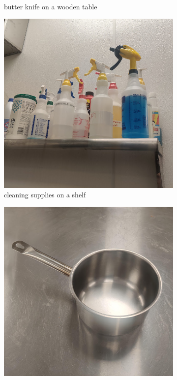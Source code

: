 \documentclass[]{article}
\begin{document}
\begin{figure}[h]
\begin{subfigure}[b]{0.2\textwidth}
        \caption{butter knife on a wooden table}
    \end{subfigure}
    \begin{subfigure}[b]{0.2\textwidth}
        \centering
        \includegraphics[width=\textwidth]{dataset/6.jpg}
        \caption{cleaning supplies on a shelf}
    \end{subfigure}
    \begin{subfigure}[b]{0.2\textwidth}
        \centering
        \includegraphics[width=\textwidth]{dataset/7.jpg}

\end{subfigure}
\end{figure}
\end{document}
